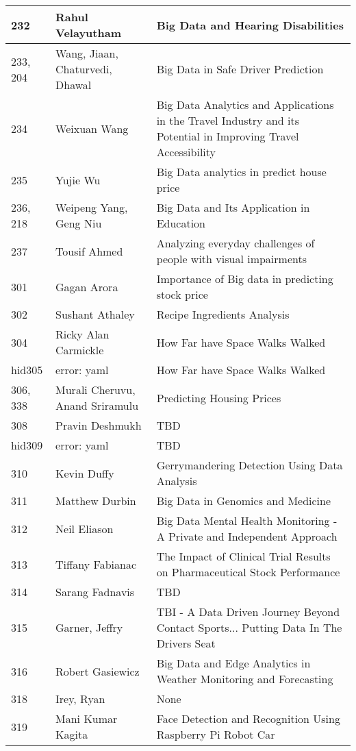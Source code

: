 \documentclass[12pt]{book}
\begin{document}
\begin{footnotesize}
\begin{longtable}{|p{1cm}p{5cm}p{9cm}|}
\hline
232 & Rahul Velayutham & Big Data and Hearing Disabilities  \\
\hline
233, 204 & Wang, Jiaan, Chaturvedi, Dhawal & Big Data in Safe Driver Prediction  \\
\hline
234 & Weixuan Wang & Big Data Analytics and Applications in the Travel Industry and its Potential in Improving Travel Accessibility
  \\
\hline
235 & Yujie Wu & Big Data analytics in predict house price  \\
\hline
236, 218 & Weipeng Yang, Geng Niu & Big Data and Its Application in Education  \\
\hline
237 & Tousif Ahmed & Analyzing everyday challenges of people with visual impairments  \\
\hline
301 & Gagan Arora & Importance of Big data in predicting stock price 
  \\
\hline
302 & Sushant Athaley & Recipe Ingredients Analysis  \\
\hline
304 & Ricky Alan Carmickle & How Far have Space Walks Walked  \\
\hline
hid305 & error: yaml & How Far have Space Walks Walked  \\
\hline
306, 338 & Murali Cheruvu, Anand Sriramulu & Predicting Housing Prices  \\
\hline
308 & Pravin Deshmukh & TBD  \\
\hline
hid309 & error: yaml & TBD  \\
\hline
310 & Kevin Duffy & Gerrymandering Detection Using Data Analysis  \\
\hline
311 & Matthew Durbin & Big Data in Genomics and Medicine  \\
\hline
312 & Neil Eliason & Big Data Mental Health Monitoring - A Private and Independent Approach
  \\
\hline
313 & Tiffany Fabianac & The Impact of Clinical Trial Results on Pharmaceutical Stock Performance
  \\
\hline
314 & Sarang Fadnavis & TBD  \\
\hline
315 & Garner, Jeffry & TBI - A Data Driven Journey Beyond Contact Sports... Putting Data In The Drivers Seat
  \\
\hline
316 & Robert Gasiewicz & Big Data and Edge Analytics in Weather Monitoring and Forecasting  \\
\hline
318 & Irey, Ryan & None  \\
\hline
319 & Mani Kumar Kagita & Face Detection and Recognition Using Raspberry Pi Robot Car  \\

\end{longtable}
\end{footnotesize}
\end{document}
